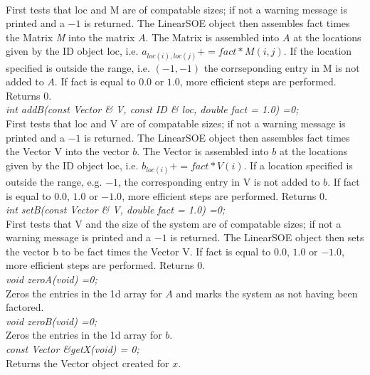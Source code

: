 { \\
First tests that \p loc and \p M are of compatable sizes; if not
a warning message is printed and a $-1$ is returned. The LinearSOE
object then assembles \p fact times the Matrix {\em 
M} into the matrix $A$. The Matrix is assembled into $A$ at the
locations given by the ID object \p loc, i.e. $a_{loc(i),loc(j)} +=
fact * M(i,j)$. If the location specified is outside the range,
i.e. $(-1,-1)$ the corrseponding entry in \p M is not added to
$A$. If \p fact is equal to $0.0$ or $1.0$, more efficient steps
are performed. Returns $0$.  \\


{\em int addB(const Vector \& V, const ID \& loc,
double fact = 1.0) =0;} \\
First tests that \p loc and \p V are of compatable sizes; if not
a warning message is printed and a $-1$ is returned. The LinearSOE
object then assembles \p fact times the Vector \p V into
the vector $b$. The Vector is assembled into $b$ at the locations
given by the ID object \p loc, i.e. $b_{loc(i)} += fact * V(i)$. If a
location specified is outside the range, e.g. $-1$, the corresponding
entry in \p V is not added to $b$. If \p fact is equal to $0.0$,
$1.0$ or $-1.0$, more efficient steps are performed. Returns $0$. \\


{\em int setB(const Vector \& V, double fact = 1.0) =0;} \\
First tests that \p V and the size of the system are of compatable
sizes; if not a warning message is printed and a $-1$ is returned. The
LinearSOE object then sets the vector \p b to be \p fact times
the Vector \p V. If \p fact is equal to $0.0$, $1.0$ or $-1.0$,
more efficient steps are performed. Returns $0$. \\ 

{\em void zeroA(void) =0;} \\
Zeros the entries in the 1d array for $A$ and marks the system as not
having been factored. \\

{\em void zeroB(void) =0;} \\
Zeros the entries in the 1d array for $b$. \\

{\em const Vector \&getX(void) = 0;} \\
Returns the Vector object created for $x$. \\

}
